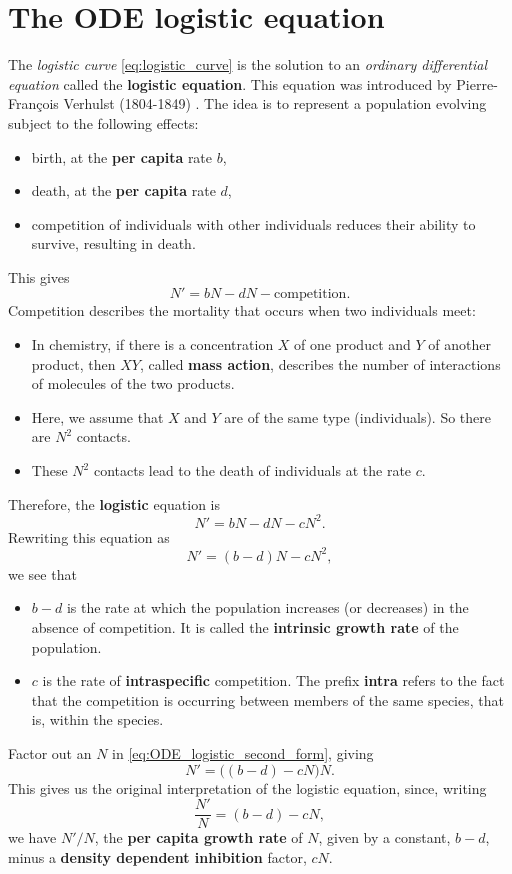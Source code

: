 \section{The ODE logistic equation}
\label{sec:ODE_logistic}

The \emph{logistic curve} \eqref{eq:logistic_curve} is the solution to an \emph{ordinary differential equation} called the \textbf{logistic equation}.
This equation was introduced by Pierre-Fran\c{c}ois Verhulst
(1804-1849) \cite{Verhulst1838,Verhulst1845}.
The idea is to represent a population evolving subject to the following effects:
\begin{itemize}
\item birth, at the \textbf{per capita} rate $b$,
\item death, at the \textbf{per capita} rate $d$,
\item competition of individuals with other individuals reduces their ability to survive, resulting in death.
\end{itemize}
This gives
\[
N'=bN-dN-\textrm{competition}.
\]
Competition describes the mortality that occurs when two individuals meet:
\begin{itemize}
\item
In chemistry, if there is a concentration $X$ of one product and $Y$ of another product, then $XY$, called \textbf{mass action}, describes the number of interactions of molecules of the two products.
\item
Here, we assume that $X$ and $Y$ are of the same type (individuals). So there are $N^2$ contacts.
\item 
These $N^2$ contacts lead to the death of individuals at the rate $c$.
\end{itemize}
Therefore, the \textbf{logistic} equation is
\begin{equation}\label{eq:ODE_logistic_second_form}
N'=bN-dN-cN^2.
\end{equation}
Rewriting this equation as
\[
N'=(b-d)N-cN^2,
\]
we see that 
\begin{itemize}
\item $b-d$ is the rate at which the population increases (or decreases) in the absence of competition. It is called the \textbf{intrinsic growth rate} of the population.
\item $c$ is the rate of \textbf{intraspecific} competition. The prefix \textbf{intra} refers to the fact that the competition is occurring between members of the same species, that is, within the species.
\end{itemize}
Factor out an $N$ in \eqref{eq:ODE_logistic_second_form}, giving
\[
N'=\bigl((b-d)-cN\bigr)N.
\]
This gives us the original interpretation of the logistic equation, since, writing
\[
\frac{N'}N=(b-d)-cN,
\]
we have $N'/N$, the \textbf{per capita growth rate} of $N$, given by a constant, $b-d$, minus a \textbf{density dependent inhibition} factor, $cN$.

